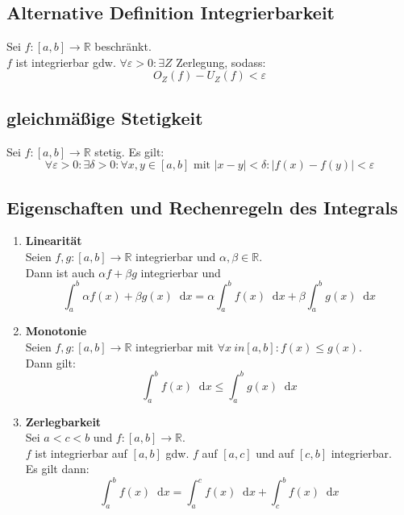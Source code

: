 \documentclass[halfparscip]{scrartcl}
\newcommand*\dif{\mathop{}\!\mathrm{d}}
\newcounter{subsection2}
\begin{document}
\subsection{Alternative Definition Integrierbarkeit}
Sei $f: [a,b] \rightarrow \mathbb{R}$ beschränkt.\\
$f$ ist integrierbar gdw. $\forall \varepsilon > 0 : \exists Z$ Zerlegung, sodass:
\begin{equation*}
	O_Z(f) - U_Z(f) < \varepsilon
\end{equation*}

\subsection{gleichmäßige Stetigkeit}
Sei $f : [a,b] \rightarrow \mathbb{R}$ stetig. Es gilt:
\begin{equation*}
	\forall \varepsilon > 0 : \exists \delta > 0 : \forall x,y \in [a,b] \text{ mit } | x - y | < \delta : |f(x) - f(y)| < \varepsilon
\end{equation*}
 
\subsection{Eigenschaften und Rechenregeln des Integrals}
\begin{enumerate}
	\item \textbf{Linearität}\\
	Seien $f,g:[a,b] \rightarrow\mathbb{R}$ integrierbar und $\alpha, \beta \in \mathbb{R}$.\\
	Dann ist auch $\alpha f + \beta g$ integrierbar und
	\begin{equation*}
		\int_{a}^{b}\alpha f(x) + \beta g(x) \dif x = \alpha \int_{a}^bf(x)\dif x + \beta \int_a^bg(x)\dif x
	\end{equation*}
	\item \textbf{Monotonie}\\
	Seien $f,g:[a,b] \rightarrow\mathbb{R}$ integrierbar mit $\forall x \ in [a,b] : f(x) \leq g(x)$.\\
	Dann gilt:
	\begin{equation*}
		\int_a^bf(x)\dif x \leq \int_a^bg(x)\dif x
	\end{equation*}
	\item \textbf{Zerlegbarkeit}\\
	Sei $a < c < b$ und $f : [a,b] \rightarrow\mathbb{R}$.\\
	$f$ ist integrierbar auf $[a,b]$ gdw. $f$ auf $[a,c]$ und auf $[c,b]$ integrierbar.\\
	Es gilt dann:
	\begin{equation*}
		\int_a^bf(x)\dif x = \int_a^cf(x)\dif x + \int_c^bf(x)\dif x
	\end{equation*}
\end{enumerate}
\end{document}
